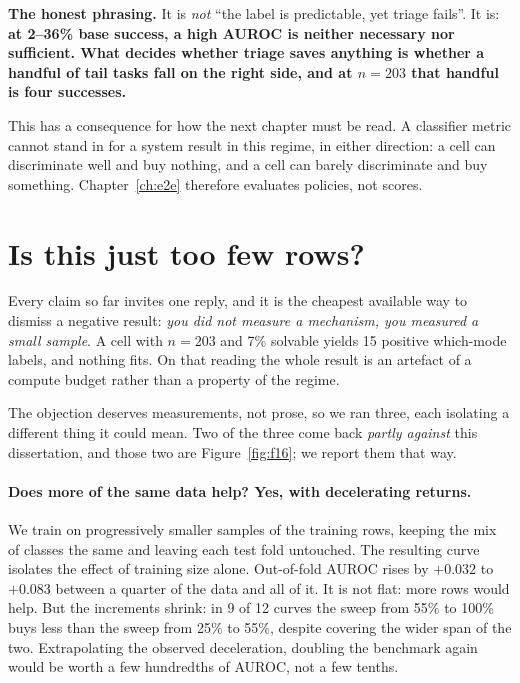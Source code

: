 \begin{scopebox}
\textbf{The honest phrasing.} It is \emph{not} ``the label is predictable, yet
triage fails''. It is: \textbf{at 2--36\% base success, a high AUROC is neither
necessary nor sufficient. What decides whether triage saves anything is whether a handful of tail tasks fall on the right side, and at $n=203$ that handful is four successes.}
\end{scopebox}

This has a consequence for how the next chapter must be read. A classifier
metric cannot stand in for a system result in this regime, in either direction:
a cell can discriminate well and buy nothing, and a cell can barely discriminate
and buy something. Chapter~\ref{ch:e2e} therefore evaluates policies, not
scores.

\FloatBarrier
\section{Is this just too few rows?}
\label{sec:undersampling}

Every claim so far invites one reply, and it is the cheapest available way to
dismiss a negative result: \emph{you did not measure a mechanism, you measured a
small sample}. A cell with $n=203$ and 7\% solvable yields 15 positive which-mode labels, and nothing fits. On that reading the whole result is
an artefact of a compute budget rather than a property of the regime.

The objection deserves measurements, not prose, so we ran three, each isolating
a different thing it could mean. Two of the three come back \emph{partly
against} this dissertation, and those two are Figure~\ref{fig:f16}; we report
them that way.

\paragraph{Does more of the same data help? Yes, with decelerating returns.}
We train on progressively smaller samples of the training rows, keeping the
mix of classes the same and leaving each test fold untouched. The resulting
curve isolates the effect of training size alone. Out-of-fold AUROC rises by $+0.032$
to $+0.083$ between a quarter of the data and all of it. It is not flat: more
rows would help. But the increments shrink: in 9 of 12 curves the sweep from
55\% to 100\% buys less than the sweep from 25\% to 55\%, despite covering the
wider span of the two. Extrapolating the observed deceleration, doubling the
benchmark again would be worth a few hundredths of AUROC, not a few tenths.

